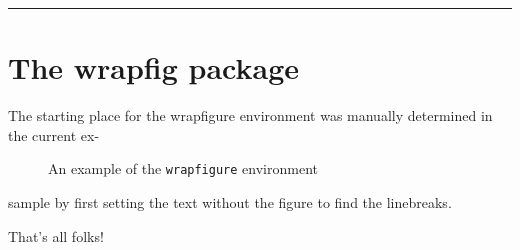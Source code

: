 \hrule
\fi

\ifx\wrapfigure\undefined \else
\clearpage
\section{The wrapfig package}

The starting place for the wrapfigure
environment was manually determined in
the current ex-
\begin{figure}
  \centering
  \caption{An example of the
    \texttt{wrapfigure} environment}
  \label{wrapfigure.1}
\end{figure}
sample by first setting the text without
the figure to find the linebreaks.

\sample \sample \sample
\fi

\clearpage
That's all folks!

